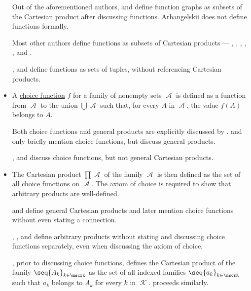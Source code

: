 \begin{remark}
\begin{itemize}
    Out of the aforementioned authors,  and  define function graphs as subsets of the Cartesian product after discussing functions. Arhangelskii does not define functions formally.

    Most other authors define functions as subsets of Cartesian products ---
    ,
    ,
    ,
    ,
    ,
     and
    .

    ,  and  define functions as sets of tuples, without referencing Cartesian products.

    \item A \hyperref[def:choice_function]{choice function} \( f \) for a family of nonempty sets \( \mscrA \) is defined as a function from \( \mscrA \) to the union \( \bigcup \mscrA \) such that, for every \( A \) in \( \mscrA \), the value \( f(A) \) belongs to \( A \).

    Both choice functions and general products are explicitly discussed by .  and  only briefly mention choice functions, but discuss general products.

    ,  and  discuss choice functions, but not general Cartesian products.

    \item The Cartesian product \( \prod \mscrA \) of the family \( \mscrA \) is then defined as the set of all choice functions on \( \mscrA \). The \hyperref[def:zfc/choice]{axiom of choice} is required to show that arbitrary products are well-defined.

     and  define general Cartesian products and later mention choice functions without even stating a connection.

    ,
    ,
     and
    define arbitrary products without stating and discussing choice functions separately, even when discussing the axiom of choice.

    , prior to discussing choice functions, defines the Cartesian product of the family \( \seq{ A_k }_{k \in \mscrK} \)  as the set of all indexed families \( \seq{ a_k }_{k \in \mscrK} \) such that \( a_k \) belongs to \( A_k \) for every \( k \) in \( \mscrK \).  proceeds similarly.
  \end{itemize}
\end{remark}

